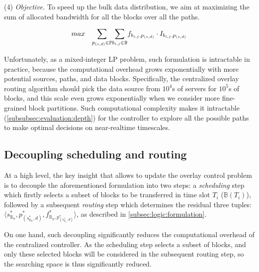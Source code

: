 \noindent(4) {\em Objective.} To speed up the bulk data distribution, we aim at maximizing the sum of allocated bandwidth for all the blocks over all the paths.

\begin{equation}
\centering
max \quad \displaystyle{\sum_{p_{(s,d)}\in \mathbb{P}}} \displaystyle{\sum_{b_{i,j} \in \mathbb{B}}} f_{b_{i,j},p_{(s,d)}} \cdot I_{b_{i,j},p_{(s,d)}}
\label{equation:objective}
\end{equation}

Unfortunately, as a mixed-integer LP problem, such formulation is intractable in practice, because the computational overhead grows exponentially with more potential sources, paths, and data blocks. Specifically, the centralized overlay routing algorithm should pick the data source from $10^4$s of servers for $10^5$s of blocks, and this scale even grows exponentially when we consider more fine-grained block partitions. Such computational complexity makes it intractable (\Section\ref{subsubsec:evaluation:depth}) for the controller to explore all the possible paths to make optimal decisions on near-realtime timescales.


\subsection{Decoupling scheduling and routing}
\label{subsec:logic:separation}

At a high level, the key insight that allows \name to update the overlay control problem is
to decouple the aforementioned formulation into two steps:
a {\em scheduling} step which firstly selects a subset of blocks to be transferred in time slot $T_i$
($\mathbb{B}(T_i)$), followed by a subsequent {\em routing}
step which determines the residual three tuples: $\langle s_{\mathbb{B}_n}^*, p^*_{(s^*_{\mathbb{B}_n},d)}, f^*_{\mathbb{B}_n,p^*_{(s^*_{\mathbb{B}_n},d)}} \rangle$, as described in \Section\ref{subsec:logic:formulation}. 

On one hand, such decoupling significantly reduces the computational overhead of the centralized controller. As the scheduling step selects a subset of blocks, and only these selected blocks will be considered in the subsequent routing step, so the searching space is thus significantly reduced.

